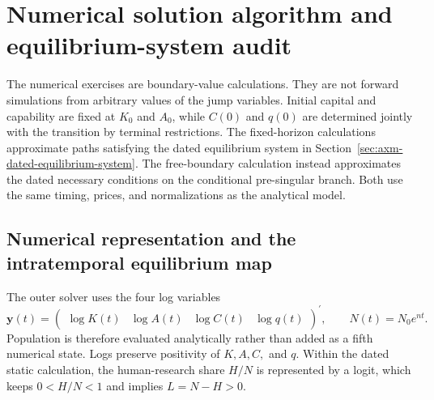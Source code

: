 \section{Numerical solution algorithm and equilibrium-system audit}
\label{app:axm-numerical-algorithm}

The numerical exercises are boundary-value calculations. They are not forward
simulations from arbitrary values of the jump variables. Initial capital and
capability are fixed at \(K_0\) and \(A_0\), while \(C(0)\) and \(q(0)\) are
determined jointly with the transition by terminal restrictions. The fixed-horizon
calculations approximate paths satisfying the dated equilibrium system in
Section~\ref{sec:axm-dated-equilibrium-system}. The free-boundary calculation
instead approximates the dated necessary conditions on the conditional
pre-singular branch. Both use the same timing, prices, and normalizations as the
analytical model.

\subsection{Numerical representation and the intratemporal equilibrium map}

The outer solver uses the four log variables
\begin{equation}
 \mathbf y(t)=
 \begin{pmatrix}\log K(t)&\log A(t)&\log C(t)&\log q(t)\end{pmatrix}^{\prime},
 \qquad N(t)=N_0e^{nt}.
 \label{eq:axm-numerical-state}
\end{equation}
Population is therefore evaluated analytically rather than added as a fifth
numerical state. Logs preserve positivity of \(K,A,C,\) and \(q\). Within the
dated static calculation, the human-research share \(H/N\) is represented by a
logit, which keeps \(0<H/N<1\) and implies \(L=N-H>0\).

